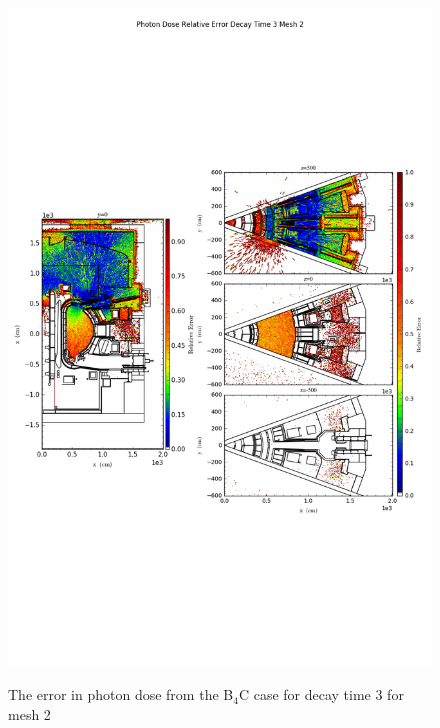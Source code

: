 \begin{figure}[ht!]
\centering
\includegraphics[trim={0cm 9cm 0cm 10cm},clip,scale=0.75]{../plots/final_model_with_b4c/Photon_Dose_Relative_Error_Decay_Time_3_Mesh_2.png}
\label{fig:photons_dc3_no4bc_m2_error}
\caption{The error in photon dose from the B$_4$C case for decay time 3 for mesh 2}
\end{figure}
